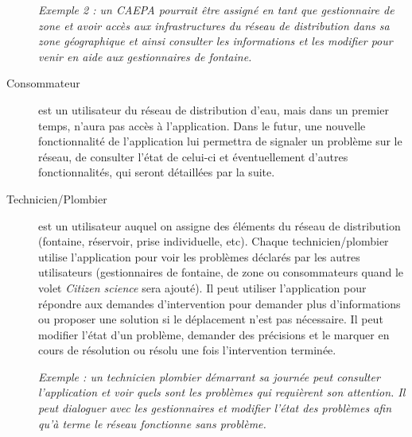 \documentclass[a4paper, 11pt]{article}
\begin{document}
\begin{description}
    \emph{Exemple 2 : un CAEPA pourrait être assigné en tant que gestionnaire de zone et avoir accès aux infrastructures du réseau de distribution dans sa zone géographique et ainsi consulter les informations et les modifier pour venir en aide aux gestionnaires de fontaine.}

    \item[Consommateur] est un utilisateur du réseau de distribution d'eau, mais dans un premier temps, n'aura pas accès à l'application. Dans le futur, une nouvelle fonctionnalité de l'application lui permettra de signaler un problème sur le réseau, de consulter l'état de celui-ci et éventuellement d'autres fonctionnalités, qui seront détaillées par la suite.

    \item[Technicien/Plombier] est un utilisateur auquel on assigne des éléments du réseau de distribution (fontaine, réservoir, prise individuelle, etc). Chaque technicien/plombier utilise l'application pour voir les problèmes déclarés par les autres utilisateurs (gestionnaires de fontaine, de zone ou consommateurs quand le volet \emph{Citizen science} sera ajouté). Il peut utiliser l'application pour répondre aux demandes d'intervention pour demander plus d'informations ou proposer une solution si le déplacement n'est pas nécessaire. Il peut modifier l'état d'un problème, demander des précisions et le marquer en cours de résolution ou résolu une fois l'intervention terminée.

    \emph{Exemple : un technicien plombier démarrant sa journée peut consulter l'application et voir quels sont les problèmes qui requièrent son attention. Il peut dialoguer avec les gestionnaires et modifier l'état des problèmes afin qu'à terme le réseau fonctionne sans problème.}

  \end{description}
\end{document}
